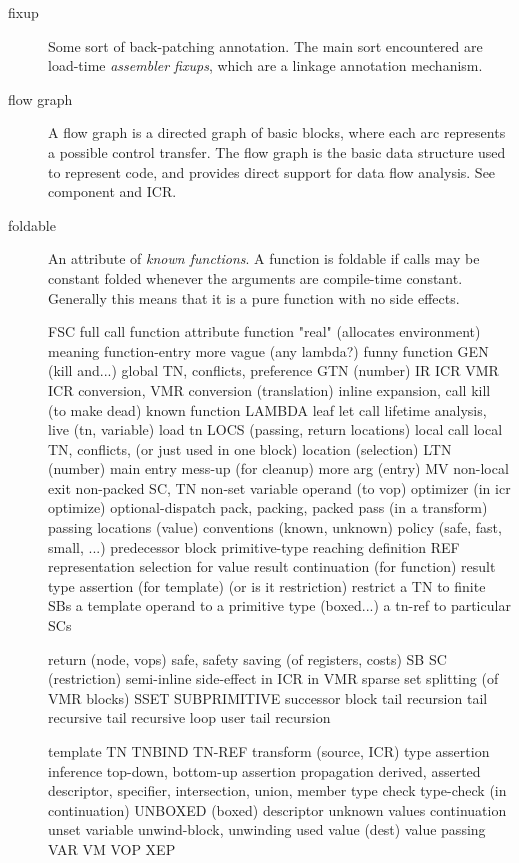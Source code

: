 \begin{description}
\item[fixup]  Some sort of back-patching annotation.  The main sort encountered
are load-time {\it assembler fixups}, which are a linkage annotation mechanism.

\item[flow graph] A flow graph is a directed graph of basic blocks, where each
arc represents a possible control transfer.  The flow graph is the basic data
structure used to represent code, and provides direct support for data flow
analysis.  See component and ICR.

\item[foldable] An attribute of {\it known functions}.  A function is foldable
if calls may be constant folded whenever the arguments are compile-time
constant.  Generally this means that it is a pure function with no side
effects.


FSC
full call
function attribute
function
        "real" (allocates environment)
        meaning function-entry
        more vague (any lambda?)
funny function
GEN (kill and...)
global TN, conflicts, preference
GTN (number)
IR ICR VMR  ICR conversion, VMR conversion (translation)
inline expansion, call
kill (to make dead)
known function
LAMBDA
leaf
let call
lifetime analysis, live (tn, variable)
load tn
LOCS (passing, return locations)
local call
local TN, conflicts, (or just used in one block)
location (selection)
LTN (number)
main entry
mess-up (for cleanup)
more arg (entry)
MV
non-local exit
non-packed SC, TN
non-set variable
operand (to vop)
optimizer (in icr optimize)
optional-dispatch
pack, packing, packed
pass (in a transform)
passing 
        locations (value)
        conventions (known, unknown)
policy (safe, fast, small, ...)
predecessor block
primitive-type
reaching definition
REF
representation
        selection
        for value
result continuation (for function)
result type assertion (for template) (or is it restriction)
restrict
        a TN to finite SBs
        a template operand to a primitive type (boxed...)
        a tn-ref to particular SCs

return (node, vops)
safe, safety
saving (of registers, costs)
SB
SC (restriction)
semi-inline
side-effect
        in ICR
        in VMR
sparse set
splitting (of VMR blocks)
SSET
SUBPRIMITIVE
successor block
tail recursion
        tail recursive
        tail recursive loop
        user tail recursion

template
TN
TNBIND
TN-REF
transform (source, ICR)
type
        assertion
        inference
                top-down, bottom-up
        assertion propagation
        derived, asserted
        descriptor, specifier, intersection, union, member type
        check
type-check (in continuation)
UNBOXED (boxed) descriptor
unknown values continuation
unset variable
unwind-block, unwinding
used value (dest)
value passing
VAR
VM
VOP
XEP

\end{description}
